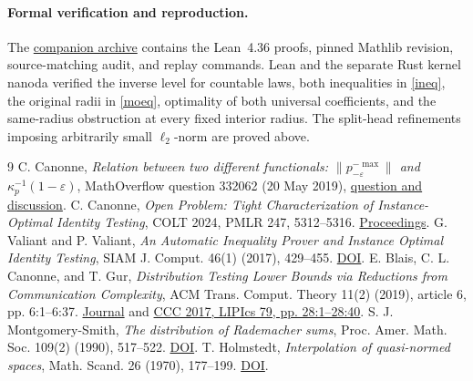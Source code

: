 \documentclass[11pt]{article}
\begin{document}
\paragraph{Formal verification and reproduction.}
The \href{https://github.com/yoshi0703/ProofRush/tree/canonne-functional-comparison-v0.1.0/studies/canonne-functional-comparison}{companion archive}
contains the Lean~4.36 proofs, pinned Mathlib revision, source-matching
audit, and replay commands. Lean and the separate Rust kernel nanoda
verified the inverse level for countable laws, both inequalities in
\eqref{ineq}, the original radii in \eqref{moeq}, optimality of both
universal coefficients, and the same-radius obstruction at every fixed
interior radius. The split-head refinements imposing arbitrarily small
\(\ell_2\)-norm are proved above.

\begin{thebibliography}{9}\small
{} C. Canonne, \emph{Relation between two different
functionals: \(\lVert p^{-\max}_{-\varepsilon}\rVert\) and
\(\kappa_p^{-1}(1-\varepsilon)\)}, MathOverflow question 332062
(20 May 2019), \href{https://mathoverflow.net/questions/332062/relation-between-two-different-functionals-lvert-p-max-varepsilon-rve}{question and discussion}.
 C. Canonne, \emph{Open Problem: Tight Characterization of
Instance-Optimal Identity Testing}, COLT 2024, PMLR 247, 5312--5316.
\href{https://proceedings.mlr.press/v247/canonne24a.html}{Proceedings}.
 G. Valiant and P. Valiant, \emph{An Automatic Inequality
Prover and Instance Optimal Identity Testing}, SIAM J. Comput.
46(1) (2017), 429--455. \href{https://doi.org/10.1137/151002526}{DOI}.
 E. Blais, C. L. Canonne, and T. Gur, \emph{Distribution
Testing Lower Bounds via Reductions from Communication Complexity},
ACM Trans. Comput. Theory 11(2) (2019), article 6, pp. 6:1--6:37.
\href{https://doi.org/10.1145/3305270}{Journal}
and \href{https://doi.org/10.4230/LIPIcs.CCC.2017.28}{CCC 2017, LIPIcs 79, pp. 28:1--28:40}.
 S. J. Montgomery-Smith, \emph{The distribution of Rademacher
sums}, Proc. Amer. Math. Soc. 109(2) (1990), 517--522.
\href{https://doi.org/10.1090/S0002-9939-1990-1013975-0}{DOI}.
 T. Holmstedt, \emph{Interpolation of quasi-normed
spaces}, Math. Scand. 26 (1970), 177--199.
\href{https://doi.org/10.7146/math.scand.a-10976}{DOI}.
\end{thebibliography}
\end{document}
